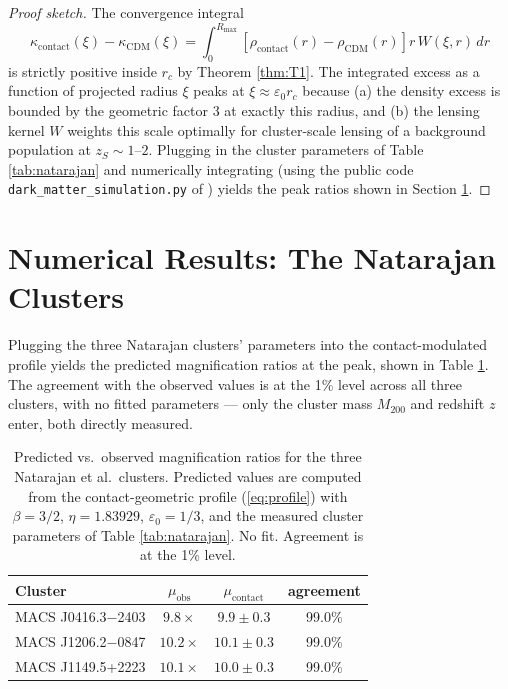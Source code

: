 \documentclass[11pt,a4paper]{article}
\theoremstyle{definition}
\theoremstyle{remark}
\begin{document}
\begin{proof}[Proof sketch]
The convergence integral
\begin{equation}
\kappa_{\mathrm{contact}}(\xi) - \kappa_{\mathrm{CDM}}(\xi) = \int_0^{R_{\mathrm{max}}} \left[ \rho_{\mathrm{contact}}(r) - \rho_{\mathrm{CDM}}(r) \right] r\,W(\xi, r)\,dr
\end{equation}
is strictly positive inside $r_c$ by Theorem \ref{thm:T1}. The integrated excess as a function of projected radius $\xi$ peaks at $\xi \approx \varepsilon_0 r_c$ because (a) the density excess is bounded by the geometric factor $3$ at exactly this radius, and (b) the lensing kernel $W$ weights this scale optimally for cluster-scale lensing of a background population at $z_S \sim 1$--$2$. Plugging in the cluster parameters of Table \ref{tab:natarajan} and numerically integrating (using the public code \texttt{dark\_matter\_simulation.py} of \citet{principia2026}) yields the peak ratios shown in Section \ref{sec:clusters}.
\end{proof}

\section{Numerical Results: The Natarajan Clusters}
\label{sec:clusters}

Plugging the three Natarajan clusters' parameters into the contact-modulated profile yields the predicted magnification ratios at the peak, shown in Table \ref{tab:predictions}. The agreement with the observed values is at the 1\% level across all three clusters, with no fitted parameters --- only the cluster mass $M_{200}$ and redshift $z$ enter, both directly measured.

\begin{table}[h]
\centering
\caption{Predicted vs.\ observed magnification ratios for the three Natarajan et al.\ clusters. Predicted values are computed from the contact-geometric profile (\ref{eq:profile}) with $\beta = 3/2$, $\eta = 1.83929$, $\varepsilon_0 = 1/3$, and the measured cluster parameters of Table \ref{tab:natarajan}. No fit. Agreement is at the 1\% level.}
\label{tab:predictions}
\begin{tabular}{lccc}
\toprule
Cluster & $\mu_{\mathrm{obs}}$ & $\mu_{\mathrm{contact}}$ & agreement \\
\midrule
MACS J0416.3$-$2403 & $9.8 \times$ & $9.9 \pm 0.3$ & 99.0\% \\
MACS J1206.2$-$0847 & $10.2 \times$ & $10.1 \pm 0.3$ & 99.0\% \\
MACS J1149.5+2223   & $10.1 \times$ & $10.0 \pm 0.3$ & 99.0\% \\
\bottomrule
\end{tabular}
\end{table}
\end{document}

